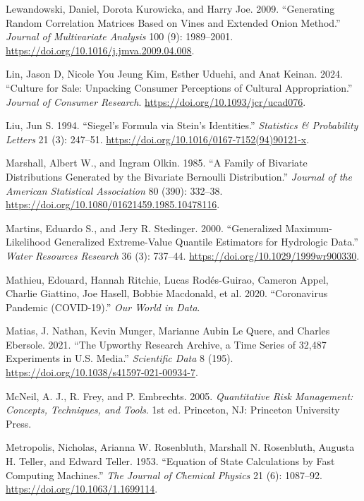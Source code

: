 \documentclass[
  11pt,
  letterpaper,
]{scrbook}
\newlength{\cslhangindent}
\newenvironment{CSLReferences}[2] %
 {\begin{list}{}{%
  \setlength{\itemindent}{0pt}
  \setlength{\leftmargin}{0pt}
  \setlength{\parsep}{0pt}
  \ifodd #1
   \setlength{\leftmargin}{\cslhangindent}
   \setlength{\itemindent}{-1\cslhangindent}
  \fi
  \setlength{\itemsep}{#2\baselineskip}}}
 {\end{list}}
\theoremstyle{definition}
\theoremstyle{plain}
\theoremstyle{plain}
\theoremstyle{plain}
\theoremstyle{definition}
\theoremstyle{definition}
\theoremstyle{remark}
\begin{document}
\begin{CSLReferences}{1}{0}
Lewandowski, Daniel, Dorota Kurowicka, and Harry Joe. 2009.
{``Generating Random Correlation Matrices Based on Vines and Extended
Onion Method.''} \emph{Journal of Multivariate Analysis} 100 (9):
1989--2001. \url{https://doi.org/10.1016/j.jmva.2009.04.008}.

Lin, Jason D, Nicole You Jeung Kim, Esther Uduehi, and Anat Keinan.
2024. {``Culture for Sale: Unpacking Consumer Perceptions of Cultural
Appropriation.''} \emph{Journal of Consumer Research}.
\url{https://doi.org/10.1093/jcr/ucad076}.

Liu, Jun S. 1994. {``{S}iegel's Formula via {S}tein's Identities.''}
\emph{Statistics \& Probability Letters} 21 (3): 247--51.
\url{https://doi.org/10.1016/0167-7152(94)90121-x}.

Marshall, Albert W., and Ingram Olkin. 1985. {``A Family of Bivariate
Distributions Generated by the Bivariate {B}ernoulli Distribution.''}
\emph{Journal of the American Statistical Association} 80 (390):
332--38. \url{https://doi.org/10.1080/01621459.1985.10478116}.

Martins, Eduardo S., and Jery R. Stedinger. 2000. {``Generalized
Maximum-Likelihood Generalized Extreme-Value Quantile Estimators for
Hydrologic Data.''} \emph{Water Resources Research} 36 (3): 737--44.
\url{https://doi.org/10.1029/1999wr900330}.

Mathieu, Edouard, Hannah Ritchie, Lucas Rodés-Guirao, Cameron Appel,
Charlie Giattino, Joe Hasell, Bobbie Macdonald, et al. 2020.
{``Coronavirus Pandemic (COVID-19).''} \emph{Our World in Data}.

Matias, J. Nathan, Kevin Munger, Marianne Aubin Le Quere, and Charles
Ebersole. 2021. {``The {U}pworthy {R}esearch {A}rchive, a Time Series of
32,487 Experiments in {U.S.} Media.''} \emph{Scientific Data} 8 (195).
\url{https://doi.org/10.1038/s41597-021-00934-7}.

McNeil, A. J., R. Frey, and P. Embrechts. 2005. \emph{Quantitative Risk
Management: Concepts, Techniques, and Tools}. 1st ed. Princeton, NJ:
Princeton University Press.

Metropolis, Nicholas, Arianna W. Rosenbluth, Marshall N. Rosenbluth,
Augusta H. Teller, and Edward Teller. 1953. {``Equation of State
Calculations by Fast Computing Machines.''} \emph{The Journal of
Chemical Physics} 21 (6): 1087--92.
\url{https://doi.org/10.1063/1.1699114}.


\end{CSLReferences}
\end{document}
